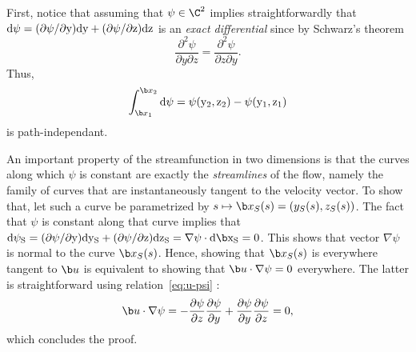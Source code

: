 \begin{tcolorbox}[title=Some properties of the streamfunction]
First, notice that assuming that $\psi \in \C^2$ implies straightforwardly that $\rm d\psi = (\partial \psi/\partial y)\rm dy + (\partial \psi/\partial z) \rm dz$ is an \textit{exact differential} since by Schwarz's theorem
\begin{equation}
	\frac{\partial^2 \psi}{\partial y \partial z} = \frac{\partial^2 \psi}{\partial z \partial y}.
\end{equation}
Thus,
\begin{equation}
\int_{\b x_1}^{\b x_2} \rm d\psi = \psi(y_2,z_2) - \psi(y_1,z_1)	
\end{equation}
is path-independant. 

An important property of the streamfunction in two dimensions is that the curves along which $\psi$ is constant are exactly the \textit{streamlines} of the flow, namely the family of curves that are instantaneously tangent to the velocity vector. To show that, let such a curve be parametrized by $s \mapsto \b x_S(s) = (y_S(s),z_S(s))$. The fact that $\psi$ is constant along that curve implies that $\rm d\psi_S = (\partial \psi/\partial y)\rm dy_S + (\partial \psi/\partial z) \rm dz_S = \nabla \psi \cdot \rm d \b x_S = 0$. This shows that vector $\nabla \psi$ is normal to the curve $\b x_S(s)$. Hence, showing that $\b x_S(s)$ is everywhere tangent to $\b u$ is equivalent to showing that $\b u \cdot \nabla \psi = 0$ everywhere. The latter is straightforward using relation~\eqref{eq:u-psi} :
\begin{equation}
	\b u \cdot \nabla \psi = -\frac{\partial \psi}{\partial z}\frac{\partial \psi}{\partial y} + \frac{\partial \psi}{\partial y}\frac{\partial \psi}{\partial z} = 0,
\end{equation}
which concludes the proof.


\end{tcolorbox}
